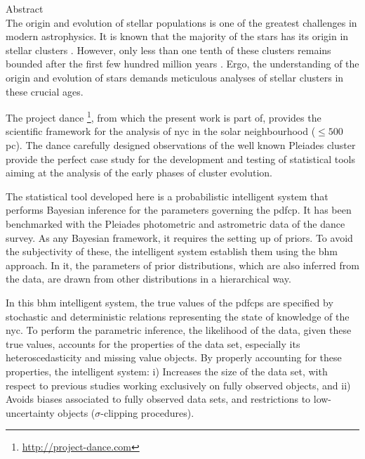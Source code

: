

{\LARGE Abstract}\\

The origin and evolution of stellar populations is one of the greatest challenges in modern astrophysics. It is known that the majority of the stars has its origin in stellar clusters \citep{2000AJ....120.3139C, 2003AJ....126.1916P,2003ARA&A..41...57L}. However, only less than one tenth of these clusters remains bounded after the first few hundred million years \citep{2003ARA&A..41...57L}. Ergo, the understanding of the origin and evolution of stars demands meticulous analyses of stellar clusters in these crucial ages.

The project \gls{dance} \footnote{\url{http://project-dance.com}}, from which the present work is part of, provides the scientific framework for the analysis of \gls{nyc} in the solar neighbourhood ($\leq 500$ pc). The \gls{dance} carefully designed observations of the well known Pleiades cluster provide the perfect case study for the development and testing of statistical tools aiming at the analysis of the early phases of cluster evolution.

The statistical tool developed here is a probabilistic intelligent system that performs Bayesian inference for the parameters governing the \gls{pdfcp}. It has been benchmarked with the Pleiades photometric and astrometric data of the \gls{dance} survey. As any Bayesian framework, it requires the setting up of priors. To avoid the subjectivity of these, the intelligent system establish them using the \gls{bhm} approach. In it, the parameters of prior distributions, which are also inferred from the data, are drawn from other distributions in a hierarchical way. 

In this \gls{bhm} intelligent system, the true values of the \glspl{pdfcp} are specified by stochastic and deterministic relations representing the state of knowledge of the \gls{nyc}. To perform the parametric inference, the likelihood of the data, given these true values, accounts for the properties of the data set, especially its heteroscedasticity and missing value objects. By properly accounting for these properties, the intelligent system: i) Increases the size of the data set, with respect to previous studies working exclusively on fully observed objects, and ii) Avoids biases associated to fully observed data sets, and restrictions to low-uncertainty objects ($\sigma$-clipping procedures).

